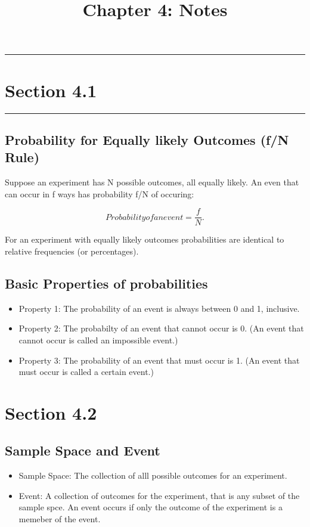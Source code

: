 \documentclass[12pt]{article}
\title{Chapter 4: Notes}
\author{}
\begin{document}
    \maketitle
    \noindent\rule{\textwidth}{0.4pt}
    \section*{Section 4.1}
    \noindent\rule{\textwidth}{0.4pt}
        \subsection*{Probability for Equally likely Outcomes (f/N Rule)}
            Suppose an experiment has N possible outcomes, all equally likely. An even that can occur in f ways has probability f/N of occuring:
            \begin{center}
                \[
                    Probability of an event = \frac{f}{N}.     
                \]                
            \end{center}
            For an experiment with equally likely outcomes probabilities are identical to relative frequencies (or percentages).
        \subsection{Basic Properties of probabilities}
            \begin{itemize}
                \item Property 1: The probability of an event is always between 0 and 1, inclusive.
                \item Property 2: The probabilty of an event that cannot occur is 0. (An event that cannot occur is called an impossible event.)
                \item Property 3: The probability of an event that must occur is 1. (An event that must occur is called a certain event.)
            \end{itemize}

    \section*{Section 4.2}
        \subsection*{Sample Space and Event}
            \begin{itemize}
                \item Sample Space: The collection of alll possible outcomes for an experiment.
                \item Event: A collection of outcomes for the experiment, that is any subset of the sample spce. An event occurs if only the outcome of the experiment is a memeber of the event.
            \end{itemize}
\end{document}
